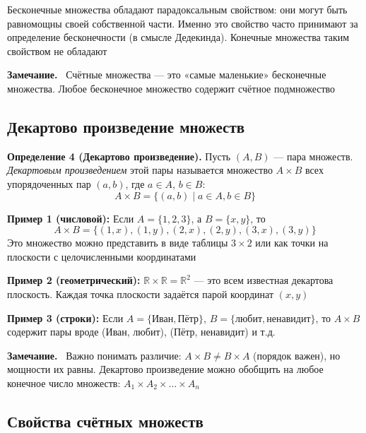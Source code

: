 \documentclass[a4paper,12pt]{article}
\newcommand{\myremark}{\textbf{Замечание.}\ }
\theoremstyle{definition}
\theoremstyle{plain}
\theoremstyle{remark}
\begin{document}
	\begin{tcolorbox}[colback=yellow!5, colframe=orange!60!black, title=Важное замечание о бесконечности]
		Бесконечные множества обладают парадоксальным свойством: они могут быть равномощны своей собственной части. Именно это свойство часто принимают за определение бесконечности (в смысле Дедекинда). Конечные множества таким свойством не обладают
	\end{tcolorbox}
	
	\myremark
	Счётные множества — это «самые маленькие» бесконечные множества. Любое бесконечное множество содержит счётное подмножество
	
	\subsection{Декартово произведение множеств}
	
	\noindent \textbf{Определение 4 (Декартово произведение).}
	Пусть $(A, B)$ — пара множеств. \textit{Декартовым произведением} этой пары называется множество $A \times B$ всех упорядоченных пар $(a, b)$, где $a \in A$, $b \in B$:
	\[
	A \times B = \{(a, b) \mid a \in A, b \in B\}
	\]
	
	\begin{tcolorbox}[colback=gray!5, colframe=gray!50, title=Примеры декартова произведения]
		\textbf{Пример 1 (числовой):} 
		Если $A = \{1, 2, 3\}$, а $B = \{x, y\}$, то
		\[
		A \times B = \{(1, x), (1, y), (2, x), (2, y), (3, x), (3, y)\}
		\]
		Это множество можно представить в виде таблицы $3 \times 2$ или как точки на плоскости с целочисленными координатами
		
		
		\medskip
		\textbf{Пример 2 (геометрический):}
		$\mathbb{R} \times \mathbb{R} = \mathbb{R}^2$ — это всем известная декартова плоскость. Каждая точка плоскости задаётся парой координат $(x, y)$
		
		\medskip
		\textbf{Пример 3 (строки):}
		Если $A = \{\text{Иван}, \text{Пётр}\}$, $B = \{\text{любит}, \text{ненавидит}\}$, то $A \times B$ содержит пары вроде (Иван, любит), (Пётр, ненавидит) и т.д.
	\end{tcolorbox}
	
	\myremark
	Важно понимать различие: $A \times B \neq B \times A$ (порядок важен), но мощности их равны. Декартово произведение можно обобщить на любое конечное число множеств: $A_1 \times A_2 \times \dots \times A_n$
	
	\subsection{Свойства счётных множеств}
	
\end{document}
